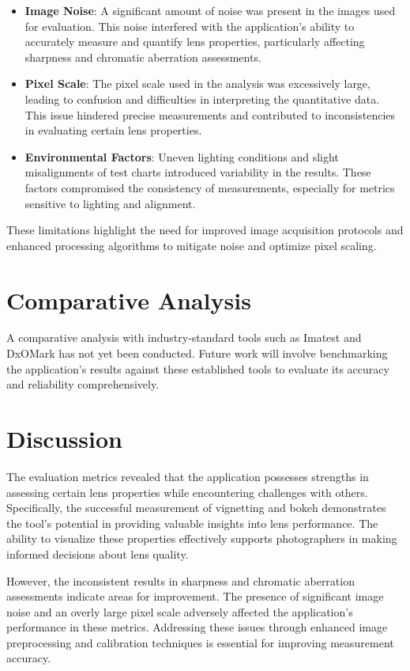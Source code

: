 \documentclass{book}
\begin{document}
\begin{itemize}
    \item \textbf{Image Noise}: A significant amount of noise was present in the images used for evaluation. This noise interfered with the application's ability to accurately measure and quantify lens properties, particularly affecting sharpness and chromatic aberration assessments.
    \item \textbf{Pixel Scale}: The pixel scale used in the analysis was excessively large, leading to confusion and difficulties in interpreting the quantitative data. This issue hindered precise measurements and contributed to inconsistencies in evaluating certain lens properties.
    \item \textbf{Environmental Factors}: Uneven lighting conditions and slight misalignments of test charts introduced variability in the results. These factors compromised the consistency of measurements, especially for metrics sensitive to lighting and alignment.
\end{itemize}

These limitations highlight the need for improved image acquisition protocols and enhanced processing algorithms to mitigate noise and optimize pixel scaling.

\section{Comparative Analysis}
A comparative analysis with industry-standard tools such as Imatest and DxOMark has not yet been conducted. Future work will involve benchmarking the application's results against these established tools to evaluate its accuracy and reliability comprehensively.

\section{Discussion}
The evaluation metrics revealed that the application possesses strengths in assessing certain lens properties while encountering challenges with others. Specifically, the successful measurement of vignetting and bokeh demonstrates the tool's potential in providing valuable insights into lens performance. The ability to visualize these properties effectively supports photographers in making informed decisions about lens quality.

However, the inconsistent results in sharpness and chromatic aberration assessments indicate areas for improvement. The presence of significant image noise and an overly large pixel scale adversely affected the application's performance in these metrics. Addressing these issues through enhanced image preprocessing and calibration techniques is essential for improving measurement accuracy.
\end{document}
